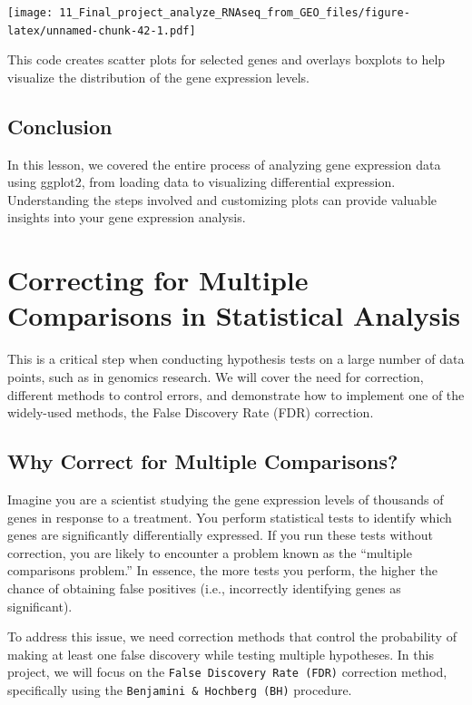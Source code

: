 \documentclass[
]{book}
\begin{document}
\texttt{[image: 11\_Final\_project\_analyze\_RNAseq\_from\_GEO\_files/figure-latex/unnamed-chunk-42-1.pdf]}

This code creates scatter plots for selected genes and overlays boxplots to help visualize
the distribution of the gene expression levels.

\hypertarget{conclusion-32}{%
\subsection{Conclusion}\label{conclusion-32}}

In this lesson, we covered the entire process of analyzing gene expression data using ggplot2, from loading data to visualizing differential expression. Understanding the steps involved and customizing plots can provide valuable insights into your gene expression analysis.

\hypertarget{correcting-for-multiple-comparisons-in-statistical-analysis}{%
\section{Correcting for Multiple Comparisons in Statistical Analysis}\label{correcting-for-multiple-comparisons-in-statistical-analysis}}

This is a critical step when conducting hypothesis tests on a large number of data points, such as in genomics research. We will cover the need for correction, different methods to control errors, and demonstrate how to implement one of the widely-used methods, the False Discovery Rate (FDR) correction.

\hypertarget{why-correct-for-multiple-comparisons}{%
\subsection{Why Correct for Multiple Comparisons?}\label{why-correct-for-multiple-comparisons}}

Imagine you are a scientist studying the gene expression levels of thousands of genes in response to a treatment. You perform statistical tests to identify which genes are significantly differentially expressed. If you run these tests without correction, you are likely to encounter a problem known as the ``multiple comparisons problem.'' In essence, the more tests you perform, the higher the chance of obtaining false positives (i.e., incorrectly identifying genes as significant).

To address this issue, we need correction methods that control the probability of making at least one false discovery while testing multiple hypotheses. In this project, we will focus on the \texttt{False\ Discovery\ Rate\ (FDR)} correction method, specifically using the \texttt{Benjamini\ \&\ Hochberg\ (BH)} procedure.
\end{document}
